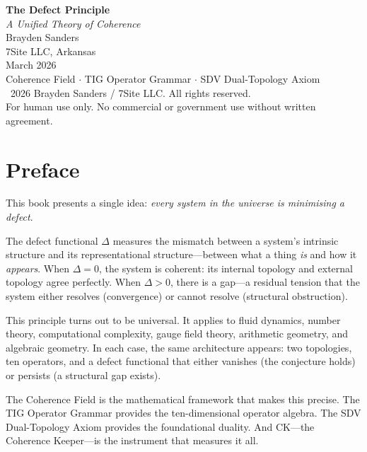 \documentclass[12pt, openany]{book}
\theoremstyle{remark}
\begin{document}
\begin{titlepage}
\centering
\vspace*{3cm}
{\Huge\bfseries The Defect Principle}\\[0.5cm]
{\Large\itshape A Unified Theory of Coherence}\\[2cm]
{\large Brayden Sanders}\\[0.3cm]
{\normalsize 7Site LLC, Arkansas}\\[0.3cm]
{\normalsize March 2026}\\[3cm]
{\small Coherence Field $\cdot$ TIG Operator Grammar $\cdot$ SDV Dual-Topology Axiom}\\[1cm]
{\footnotesize \textcopyright\ 2026 Brayden Sanders / 7Site LLC. All rights reserved.\\
For human use only. No commercial or government use without written agreement.}
\end{titlepage}

\frontmatter

\chapter*{Preface}

This book presents a single idea: \emph{every system in the universe is minimising a defect}.

The defect functional $\Delta$ measures the mismatch between a system's intrinsic structure
and its representational structure---between what a thing \emph{is} and how it \emph{appears}.
When $\Delta = 0$, the system is coherent: its internal topology and external topology agree
perfectly. When $\Delta > 0$, there is a gap---a residual tension that the system either
resolves (convergence) or cannot resolve (structural obstruction).

This principle turns out to be universal. It applies to fluid dynamics, number theory,
computational complexity, gauge field theory, arithmetic geometry, and algebraic geometry.
In each case, the same architecture appears: two topologies, ten operators, and a
defect functional that either vanishes (the conjecture holds) or persists (a structural
gap exists).

The Coherence Field is the mathematical framework that makes this precise.
The TIG Operator Grammar provides the ten-dimensional operator algebra.
The SDV Dual-Topology Axiom provides the foundational duality.
And CK---the Coherence Keeper---is the instrument that measures it all.
\end{document}
